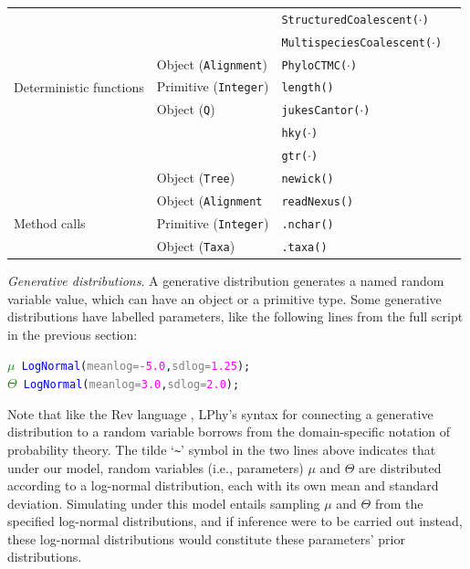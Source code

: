 \documentclass[10pt,letterpaper,table]{article}
\begin{document}
\begin{table}[h]
\begin{tabular}{p{2cm}lll}
              & & \texttt{StructuredCoalescent($\cdot$)} &\\
              & & \texttt{MultispeciesCoalescent($\cdot$)} &\\
              & Object (\texttt{Alignment}) & \texttt{PhyloCTMC($\cdot$)} & \cite{felsenstein1981}\\\hline
    Deterministic functions & Primitive (\texttt{Integer}) & \texttt{length()} &\\
              & Object (\texttt{Q}) & \texttt{jukesCantor($\cdot$)} & \cite{jc69}\\
              & & \texttt{hky($\cdot$)} & \cite{hky}\\
              & & \texttt{gtr($\cdot$)} & \cite{gtr}\\
              & Object (\texttt{Tree}) & \texttt{newick()} &\\
              & Object (\texttt{Alignment} & \texttt{readNexus()} &\\\hline
    Method calls & Primitive (\texttt{Integer}) & \texttt{.nchar()} &\\
              & Object (\texttt{Taxa}) & \texttt{.taxa()} &\\
  \end{tabular}
  \label{tab:generators}
\end{table}

\noindent \emph{Generative distributions}. A generative distribution
generates a named random variable value, which can have an object or a
primitive type.
Some generative distributions have labelled parameters, like the
following lines from the full script in the previous section:

{\singlespacing
\begin{alltt}
  \textcolor{green}{\(\mu\)} ~ \textcolor{blue}{LogNormal}(\textcolor{gray}{meanlog=}\textcolor{magenta}{-5.0}, \textcolor{gray}{sdlog=}\textcolor{magenta}{1.25});
  \textcolor{green}{\(\Theta\)} ~ \textcolor{blue}{LogNormal}(\textcolor{gray}{meanlog=}\textcolor{magenta}{3.0}, \textcolor{gray}{sdlog=}\textcolor{magenta}{2.0});
\end{alltt}
}

Note that like the Rev language \cite{revbayes}, LPhy's syntax for
connecting a generative distribution to a random variable borrows from
the domain-specific notation of probability theory.
The tilde `\texttt{\~}' symbol in the two lines above indicates that
under our model, random variables (i.e., parameters) \texttt{$\mu$}
and \texttt{$\Theta$} are distributed according to a log-normal
distribution, each with its own mean and standard deviation.
Simulating under this model entails sampling \texttt{$\mu$} and
\texttt{$\Theta$} from the specified log-normal distributions, and if
inference were to be carried out instead, these log-normal distributions
would constitute these parameters' prior distributions.\newline
\end{document}
